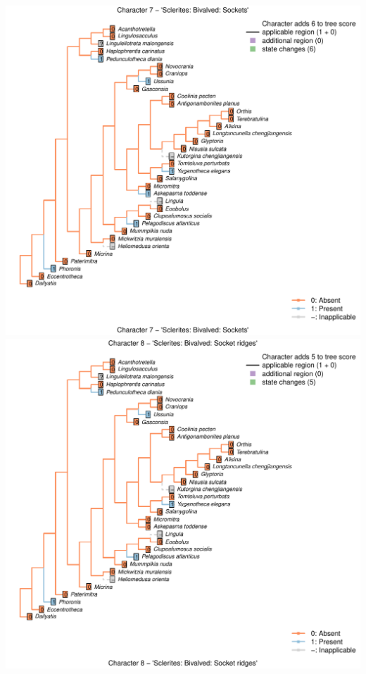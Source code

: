 \documentclass[]{book}
\theoremstyle{definition}
\theoremstyle{definition}
\theoremstyle{definition}
\theoremstyle{remark}
\begin{document}
\includegraphics{Brachiopod_phylogeny_files/figure-latex/unnamed-chunk-4-7.pdf}
\includegraphics{Brachiopod_phylogeny_files/figure-latex/unnamed-chunk-4-8.pdf}
\end{document}
